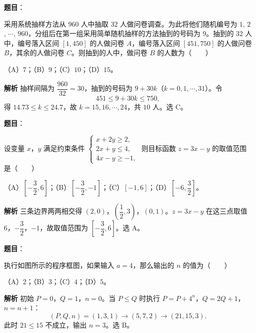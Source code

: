 \begin{answer}

\textbf{题目}：

采用系统抽样方法从 $960$ 人中抽取 $32$ 人做问卷调查。为此将他们随机编号为 $1$, $2$, $\cdots$, $960$，分组后在第一组采用简单随机抽样的方法抽到的号码为 $9$。抽到的 $32$ 人中，编号落入区间 $[1,450]$ 的人做问卷 $A$，编号落入区间 $[451,750]$ 的人做问卷 $B$，其余的人做问卷 $C$。则抽到的人中，做问卷 $B$ 的人数为\mbox{（　　）}

（A）$7$；（B）$9$；（C）$10$；（D）$15$。

\textbf{解析}
抽样间隔为 $\dfrac{960}{32}=30$，抽到的号码为 $9+30k$（$k=0,1,\cdots,31$）。令
\nopagebreak[4]
\[451\leqslant9+30k\leqslant750,\]
得 $14.73\leqslant k\leqslant24.7$，故 $k=15,16,\cdots,24$，共 $10$ 人。选 C。


\end{answer}
\begin{answer}

\textbf{题目}：

设变量 $x$，$y$ 满足约束条件 $\begin{cases}x+2y\geqslant2,\\2x+y\leqslant4,\\4x-y\geqslant-1,\end{cases}$ 则目标函数 $z=3x-y$ 的取值范围是\mbox{（　　）}

（A）$\left[-\dfrac32,6\right]$；（B）$\left[-\dfrac32,-1\right]$；（C）$[-1,6]$；（D）$\left[-6,\dfrac32\right]$。

\textbf{解析}
三条边界两两相交得 $(2,0)$，$\left(\dfrac12,3\right)$，$(0,1)$。$z=3x-y$ 在这三点取值 $6$，$-\dfrac32$，$-1$，故取值范围为 $\left[-\dfrac32,6\right]$。选 A。


\end{answer}
\begin{answer}

\textbf{题目}：

执行如图所示的程序框图，如果输入 $a=4$，那么输出的 $n$ 的值为\mbox{（　　）}
\nopagebreak[4]
\begin{center}\end{center}
\nopagebreak[4]
（A）$2$；（B）$3$；（C）$4$；（D）$5$。

\textbf{解析}
初始 $P=0$，$Q=1$，$n=0$。当 $P\leqslant Q$ 时执行 $P=P+4^n$，$Q=2Q+1$，$n=n+1$：
\nopagebreak[4]
\[(P,Q,n)=(1,3,1)\to(5,7,2)\to(21,15,3).\]
此时 $21\leqslant15$ 不成立，输出 $n=3$。选 B。


\end{answer}
